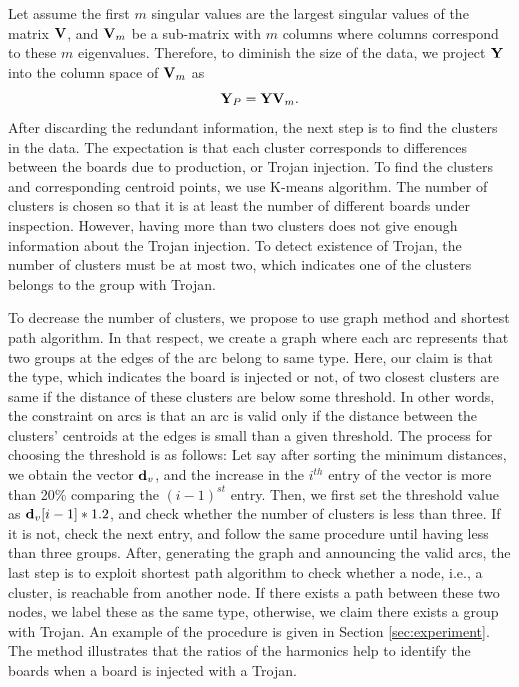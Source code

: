 \documentclass[journal]{IEEEtran}
\begin{document}
Let assume the first $m$ singular values are the largest singular values  of the matrix ${\bf V}$,  and ${\bf V}_m$ be a sub-matrix with $m$ columns where columns correspond to these $m$ eigenvalues. 
Therefore, to diminish the size of the data, we project ${\bf Y}$ into the column space of ${\bf V}_m$ as
\begin{equation}
{\bf Y}_P = {\bf Y} {\bf V}_m.
\end{equation} 
After discarding the redundant information, the next step is to find the clusters in the data. The expectation is that each cluster corresponds to differences between the boards due to production, or Trojan injection.  To find the clusters and corresponding centroid points, we use K-means algorithm. The number of clusters is chosen so that it is at least the number of different boards under inspection. However, having more than two clusters does not give enough information about the Trojan injection. To  detect existence of Trojan, the number of clusters must be at most two, which indicates one of the clusters belongs to the group with Trojan. 
%

To decrease the number of clusters, we propose to use graph method and shortest path algorithm. In that respect, we create a graph where each arc represents that two groups at the edges of the arc belong to same type. Here, our claim is that the type, which indicates the board is injected or not,  of two closest clusters are same if the distance of these clusters are below some threshold.  In other words, the constraint on arcs is that an arc is valid only if the distance between the clusters' centroids at the edges is small than a given threshold. The process for choosing the threshold is as follows: Let say after sorting the minimum distances, we obtain the vector ${\bf d}_v$, and the increase in the $i^{th}$ entry of the vector is more than 20\% comparing the $(i -1)^{st}$ entry. Then, we first set the threshold value as ${\bf d}_v[i-1]* 1.2$, and check whether the number of clusters is less than three.  If it is not, check the next entry, and follow the same procedure until having less than three groups. After, generating the graph and announcing the valid arcs, the last step is to exploit shortest path algorithm to check whether a node, i.e., a cluster, is reachable from another node. If there exists a path between these two nodes, we label these as the same type, otherwise, we claim there exists a group with Trojan. An example of the procedure is given in Section \ref{sec:experiment}. The method illustrates that the ratios of the harmonics help to identify the boards when a board is injected  with a Trojan.
\end{document}

